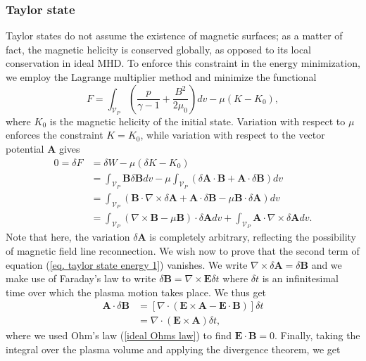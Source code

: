 \documentclass[my_thesis.tex]{subfiles}
\begin{document}
\subsubsection{Taylor state}
Taylor states do not assume the existence of magnetic surfaces; as a matter of fact, the magnetic helicity is conserved globally, as opposed to its local conservation in ideal MHD. To enforce this constraint in the energy minimization, we employ the Lagrange multiplier method and minimize the functional
\begin{equation}
	F = \int_{\mathcal{V}_P} \left(\frac{p}{\gamma-1}+\frac{B^2}{2\mu_0}\right)dv - \mu(K-K_0),
\end{equation}
where $K_0$ is the magnetic helicity of the initial state. Variation with respect to $\mu$ enforces the constraint $K=K_0$, while variation with respect to the vector potential $\mathbf{A}$ gives
\begin{align}
	0 = \delta F &= \delta W - \mu(\delta K - K_0)\\
	&= \int_{\mathcal{V}_P} \mathbf{B}\delta \mathbf{B} dv - \mu \int_{\mathcal{V}_P} (\delta \mathbf{A} \cdot \mathbf{B} + \mathbf{A} \cdot \delta \mathbf{B})dv\\
	&=\int_{\mathcal{V}_P} \left(\mathbf{B} \cdot \nabla \times \delta \mathbf{A} + \mathbf{A}\cdot \delta \mathbf{B} - \mu \mathbf{B} \cdot \delta \mathbf{A}\right) dv\\
	&=\int_{\mathcal{V}_P} \left( \nabla \times \mathbf{B} - \mu \mathbf{B} \right) \cdot \delta \mathbf{A}dv + \int_{\mathcal{V}_P}\mathbf{A} \cdot \nabla \times \delta \mathbf{A} dv. \label{eq. taylor state energy 1}
\end{align}
Note that here, the variation $\delta \mathbf{A}$ is completely arbitrary, reflecting the possibility of magnetic field line reconnection. We wish now to prove that the second term of equation (\ref{eq. taylor state energy 1}) vanishes. We write $\nabla\times\delta\mathbf{A}=\delta\mathbf{B}$ and we make use of Faraday's law to write $\delta\mathbf{B} = \nabla\times\mathbf{E}\delta t$ where $\delta t$ is an infinitesimal time over which the plasma motion takes place. We thus get
\begin{align}
	\mathbf{A}\cdot\delta\mathbf{B}&=\left[\nabla\cdot(\mathbf{E}\times\mathbf{A}-\mathbf{E}\cdot\mathbf{B})\right]\delta t\\
	&= \nabla\cdot(\mathbf{E}\times\mathbf{A})\delta t,
\end{align}
where we used Ohm's law (\ref{ideal Ohms law}) to find $\mathbf{E}\cdot\mathbf{B}=0$. Finally, taking the integral over the plasma volume and applying the divergence theorem, we get
\end{document}
